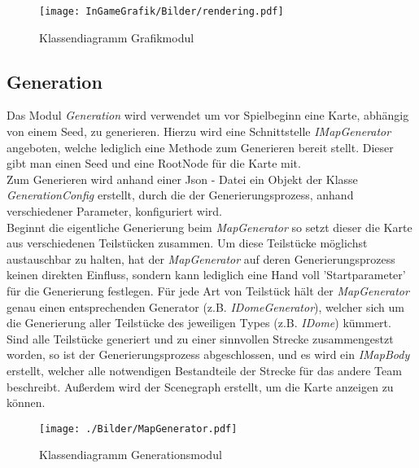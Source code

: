 \documentclass[parskip=full]{scrartcl}
\begin{document}
		\begin{figure}[htbp]
            \centering
            \texttt{[image: InGameGrafik/Bilder/rendering.pdf]}
            \caption{Klassendiagramm Grafikmodul}
        \end{figure}

		\pagebreak
		
		
		

		\pagebreak
			
		\subsection{Generation}
			
			Das Modul \textit{Generation} wird verwendet um vor Spielbeginn eine Karte, abhängig von einem Seed, 
			zu generieren. Hierzu wird eine Schnittstelle \textit{IMapGenerator} angeboten, welche lediglich eine Methode zum 
			Generieren bereit stellt. Dieser gibt man einen Seed und eine RootNode für die Karte mit.\\
			Zum Generieren wird anhand einer Json - Datei ein Objekt der Klasse \textit{GenerationConfig} 
			erstellt, durch die der Generierungsprozess, anhand verschiedener Parameter, konfiguriert wird.\\

			Beginnt die eigentliche Generierung beim \textit{MapGenerator} so setzt dieser die Karte aus verschiedenen 
			Teilstücken zusammen. Um diese Teilstücke möglichst austauschbar zu halten, hat der \textit{MapGenerator} auf deren Generierungsprozess 
			keinen direkten Einfluss, sondern kann lediglich eine Hand voll 'Startparameter' für die Generierung festlegen. 
			Für jede Art von Teilstück hält der \textit{MapGenerator} genau einen entsprechenden Generator (z.B. \textit{IDomeGenerator}), 
			welcher sich um die Generierung aller Teilstücke des jeweiligen Types (z.B. \textit{IDome}) kümmert.\\

			Sind alle Teilstücke generiert und zu einer sinnvollen Strecke zusammengestzt worden, so ist der Generierungsprozess abgeschlossen, 
			und es wird ein \textit{IMapBody} erstellt, welcher alle notwendigen Bestandteile der Strecke für das andere Team beschreibt. 
			Außerdem wird der Scenegraph erstellt, um die Karte anzeigen zu können.\par
			
			\begin{figure}[htbp]
				\centering
				\texttt{[image: ./Bilder/MapGenerator.pdf]}
				\caption{Klassendiagramm Generationsmodul}
			\end{figure}
		
\end{document}
